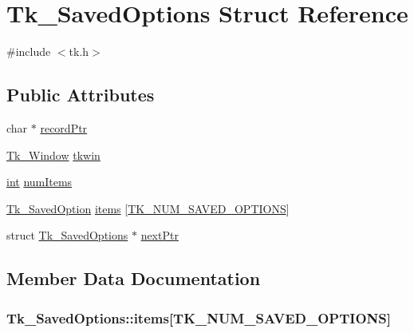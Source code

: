 \hypertarget{struct_tk___saved_options}{}\section{Tk\+\_\+\+Saved\+Options Struct Reference}
\label{struct_tk___saved_options}


{\ttfamily \#include $<$tk.\+h$>$}

\subsection*{Public Attributes}
\begin{DoxyCompactItemize}
\item 
char $\ast$ \hyperlink{struct_tk___saved_options_a7f2d523f73ed349fad480ebc3d56f00c}{record\+Ptr}
\item 
\hyperlink{tk_8h_ab756137de3ee74edc2501bd0d761e37c}{Tk\+\_\+\+Window} \hyperlink{struct_tk___saved_options_a0464e3b345d3e7826c032a3e5711b754}{tkwin}
\item 
\hyperlink{tk_8h_a83f82f76e7fed06f4c49d2db94028a6d}{int} \hyperlink{struct_tk___saved_options_a101134ab8693f5b67b4313ab9e44e76d}{num\+Items}
\item 
\hyperlink{struct_tk___saved_option}{Tk\+\_\+\+Saved\+Option} \hyperlink{struct_tk___saved_options_a187993757563f1e63ee491fcac230d00}{items} \mbox{[}\hyperlink{tk_8h_a9a7d42c8862fa42c35c4d788fc0d94f7}{T\+K\+\_\+\+N\+U\+M\+\_\+\+S\+A\+V\+E\+D\+\_\+\+O\+P\+T\+I\+O\+NS}\mbox{]}
\item 
struct \hyperlink{struct_tk___saved_options}{Tk\+\_\+\+Saved\+Options} $\ast$ \hyperlink{struct_tk___saved_options_a7527bfee924e87d562d0c83877d3ea7e}{next\+Ptr}
\end{DoxyCompactItemize}


\subsection{Member Data Documentation}
\subsubsection[{\texorpdfstring{items}{items}}]{ Tk\+\_\+\+Saved\+Options\+::items\mbox{[}{\bf T\+K\+\_\+\+N\+U\+M\+\_\+\+S\+A\+V\+E\+D\+\_\+\+O\+P\+T\+I\+O\+NS}\mbox{]}}\hypertarget{struct_tk___saved_options_a187993757563f1e63ee491fcac230d00}{}\label{struct_tk___saved_options_a187993757563f1e63ee491fcac230d00}
